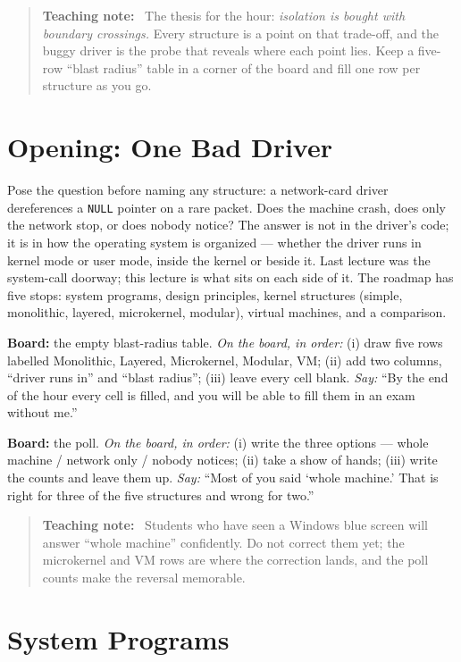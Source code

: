 \documentclass[11pt]{article}
\newenvironment{teachingaside}{\begin{quote}\small\color{primary-gold}\textbf{Teaching note:}\ }{\end{quote}}
\begin{document}
\begin{teachingaside}
The thesis for the hour: \emph{isolation is bought with boundary crossings.} Every structure is a point on that trade-off, and the buggy driver is the probe that reveals where each point lies. Keep a five-row ``blast radius'' table in a corner of the board and fill one row per structure as you go.
\end{teachingaside}

\section{Opening: One Bad Driver}

Pose the question before naming any structure: a network-card driver dereferences a \texttt{NULL} pointer on a rare packet. Does the machine crash, does only the network stop, or does nobody notice? The answer is not in the driver's code; it is in how the operating system is organized --- whether the driver runs in kernel mode or user mode, inside the kernel or beside it. Last lecture was the system-call doorway; this lecture is what sits on each side of it. The roadmap has five stops: system programs, design principles, kernel structures (simple, monolithic, layered, microkernel, modular), virtual machines, and a comparison.

\textbf{Board:} the empty blast-radius table. \emph{On the board, in order:} (i) draw five rows labelled Monolithic, Layered, Microkernel, Modular, VM; (ii) add two columns, ``driver runs in'' and ``blast radius''; (iii) leave every cell blank. \emph{Say:} ``By the end of the hour every cell is filled, and you will be able to fill them in an exam without me.''

\textbf{Board:} the poll. \emph{On the board, in order:} (i) write the three options --- whole machine / network only / nobody notices; (ii) take a show of hands; (iii) write the counts and leave them up. \emph{Say:} ``Most of you said `whole machine.' That is right for three of the five structures and wrong for two.''

\begin{teachingaside}
Students who have seen a Windows blue screen will answer ``whole machine'' confidently. Do not correct them yet; the microkernel and VM rows are where the correction lands, and the poll counts make the reversal memorable.
\end{teachingaside}

\section{System Programs}
\end{document}
